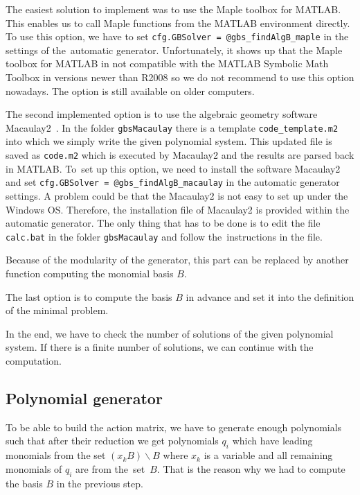 The easiest solution to implement was to use the Maple toolbox for MATLAB. This enables us to call Maple functions from the MATLAB environment directly. To use this option, we have to set \texttt{cfg.GBSolver = @gbs\_findAlgB\_maple} in the settings of the~automatic generator. Unfortunately, it shows up that the Maple toolbox for MATLAB in not compatible with the MATLAB Symbolic Math Toolbox in versions newer than R2008 so we do not recommend to use this option nowadays. The option is still available on older computers.

The second implemented option is to use the algebraic geometry software Macau\-lay2~\cite{M2}. In the folder \texttt{gbsMacaulay} there is a template \texttt{code\_template.m2} into which we simply write the given polynomial system. This updated file is saved as \texttt{code.m2} which is executed by Macaulay2 and the results are parsed back in MATLAB. To~set up this option, we need to install the software Macaulay2 and set \texttt{cfg.GBSolver = @gbs\_findAlgB\_macaulay} in the automatic generator settings. A problem could be that the Macaulay2 is not easy to set up under the Windows OS. Therefore, the installation file of Macaulay2 is provided within the automatic generator. The only thing that has to be done is to edit the file \texttt{calc.bat} in the folder \texttt{gbsMacaulay} and follow the~instructions in the file.

Because of the modularity of the generator, this part can be replaced by another function computing the monomial basis $B$.

The last option is to compute the basis $B$ in advance and set it into the definition of the minimal problem.

In the end, we have to check the number of solutions of the given polynomial system. If there is a finite number of solutions, we can continue with the computation.

\subsection{Polynomial generator}
\label{subsec:polynomialGenerator}
To be able to build the action matrix, we have to generate enough polynomials such that after their reduction we get polynomials $q_i$ which have leading monomials from the set $\left(x_k B\right)\backslash B$ where $x_k$ is a variable and all remaining monomials of $q_i$ are from the~set~$B$. That is the reason why we had to compute the basis $B$ in the previous step.

